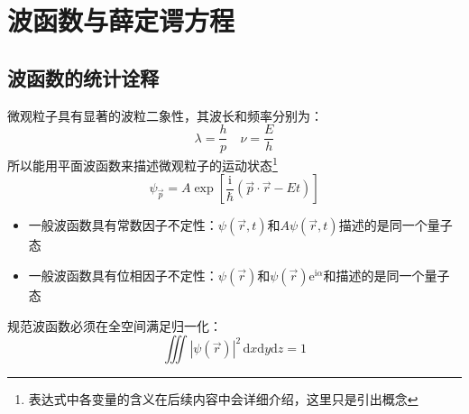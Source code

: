 \section{波函数与薛定谔方程}

\subsection{波函数的统计诠释}
微观粒子具有显著的波粒二象性，其波长和频率分别为：
$$
    \lambda=\frac{h}{p} \quad \nu=\frac{E}{h}
$$
所以能用平面波函数来描述微观粒子的运动状态\footnote{表达式中各变量的含义在后续内容中会详细介绍，这里只是引出概念}
$$
    \psi_{\vec{p}}=A\exp\left[\frac{\mathrm{i}}{\hbar}\left(\vec{p}\cdot\vec{r}-Et\right)\right]
$$
\begin{itemize}
    \item 一般波函数具有常数因子不定性：$\psi(\vec{r},t)$和$A\psi(\vec{r},t)$描述的是同一个量子态
    \item 一般波函数具有位相因子不定性：$\psi(\vec{r})$和$\psi(\vec{r})\mathrm{e}^{\mathrm{i}\alpha}$和描述的是同一个量子态
\end{itemize}
规范波函数必须在全空间满足归一化：
$$
    \iiint\left|\psi(\vec{r})\right|^2\,\mathrm{d}x\mathrm{d}y\mathrm{d}z=1
$$











